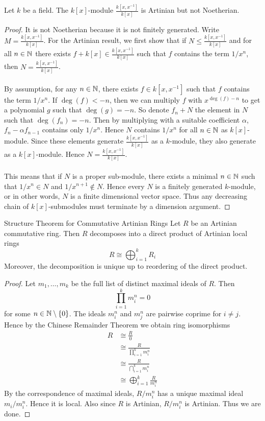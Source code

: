 \documentclass[a4paper]{article}
\begin{document}
\begin{eg}{}{} Let $k$ be a field. The $k[x]$-module $\frac{k[x,x^{-1}]}{k[x]}$ is Artinian but not Noetherian. 
\begin{proof}
It is not Noetherian because it is not finitely generated. Write $M=\frac{k[x,x^{-1}]}{k[x]}$. For the Artinian result, we first show that if $N\leq\frac{k[x,x^{-1}]}{k[x]}$ and for all $n\in\mathbb{N}$ there exists $f+k[x]\in\frac{k[x,x^{-1}]}{k[x]}$ such that $f$ contains the term $1/x^n$, then $N=\frac{k[x,x^{-1}]}{k[x]}$. \\~\\

By assumption, for any $n\in\mathbb{N}$, there exists $f\in k[x,x^{-1}]$ such that $f$ contains the term $1/x^n$. If $\deg(f)<-n$, then we can multiply $f$ with $x^{\deg(f)-n}$ to get a polynomial $g$ such that $\deg(g)=-n$. So denote $f_n+N$ the element in $N$ such that $\deg(f_n)=-n$. Then by multiplying with a suitable coefficient $\alpha$, $f_n-\alpha f_{n-1}$ contains only $1/x^n$. Hence $N$ contains $1/x^n$ for all $n\in\mathbb{N}$ as $k[x]$-module. Since these elements generate $\frac{k[x,x^{-1}]}{k[x]}$ as a $k$-module, they also generate as a $k[x]$-module. Hence $N=\frac{k[x,x^{-1}]}{k[x]}$. \\~\\

This means that if $N$ is a proper sub-module, there exists a minimal $n\in\mathbb{N}$ such that $1/x^n\in N$ and $1/x^{n+1}\notin N$. Hence every $N$ is a finitely generated $k$-module, or in other words, $N$ is a finite dimensional vector space. Thus any decreasing chain of $k[x]$-submodules must terminate by a dimension argument. 
\end{proof}
\end{eg}

\begin{thm}{Structure Theorem for Commutative Artinian Rings}{} Let $R$ be an Artinian commutative ring. Then $R$ decomposes into a direct product of Artinian local rings $$R\cong\bigoplus_{i=1}^k R_i$$ Moreover, the decomposition is unique up to reordering of the direct product.  
\begin{proof}
Let $m_1,\dots,m_k$ be the full list of distinct maximal ideals of $R$. Then $$\prod_{i=1}^km_i^n=0$$ for some $n\in\mathbb{N}\setminus\{0\}$. The ideals $m_i^n$ and $m_j^n$ are pairwise coprime for $i\neq j$. Hence by the Chinese Remainder Theorem we obtain ring isomorphisms 
\begin{align*}
R&\cong\frac{R}{0}\\
&\cong\frac{R}{\prod_{i=1}^km_i^n}\\
&\cong\frac{R}{\bigcap_{i=1}^km_i^n}\tag{$m_i^n$ and $m_j^n$ pairwise coprime}\\
&\cong\bigoplus_{i=1}^k\frac{R}{m_i^n}\tag{CRT}
\end{align*}
By the correspondence of maximal ideals, $R/m_i^n$ has a unique maximal ideal $m_i/m_i^n$. Hence it is local. Also since $R$ is Artinian, $R/m_i^n$ is Artinian. Thus we are done. 
\end{proof}
\end{thm}
\end{document}
